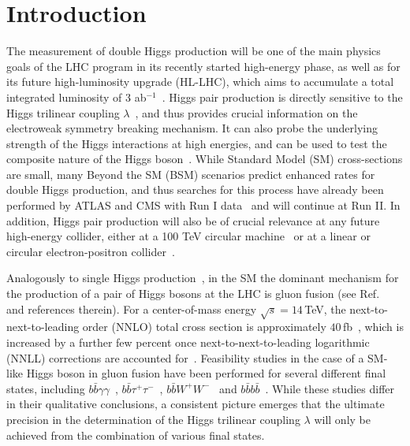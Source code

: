 \section{Introduction}

The measurement of double Higgs production will be one of the main
physics goals of the LHC program in its recently started high-energy
phase, as well as for its future high-luminosity upgrade (HL-LHC),
which aims to accumulate a total integrated
luminosity of 3 ab$^{-1}$~\cite{ATLAS:2013hta,CMS:2013xfa}.
%
Higgs pair production is directly sensitive to the
Higgs trilinear coupling $\lambda$~\cite{baglio}, and thus 
provides crucial
information on the electroweak symmetry breaking mechanism.
%
It can also probe the underlying strength of the Higgs interactions
at high energies, and can be used to test the composite nature of the 
Higgs boson~\cite{Giudice:2007fh,Contino:2010mh}.
%
While Standard Model (SM) cross-sections are small,
many Beyond the SM (BSM)
scenarios predict enhanced rates for double Higgs production, and
thus searches for this process have already been performed by ATLAS and CMS with Run I data~\cite{Aad:2015uka,Aad:2014yja,Khachatryan:2015yea,Chatrchyan:2011wt}
and will continue at Run II.
%
In addition, Higgs pair production will also be of
crucial relevance at
any future high-energy 
collider, either at a 100 TeV circular machine~\cite{Barr:2014sga,Papaefstathiou:2015iba,Azatov:2015oxa} or at
a linear or circular electron-positron collider~\cite{Contino:2013gna}.

Analogously to single Higgs production~\cite{Dittmaier:2012vm}, 
in the SM the dominant mechanism for the production of a pair of
Higgs bosons at the LHC is 
gluon fusion (see Ref.~\cite{baglio,Frederix:2014hta} and
references therein).
%
For a center-of-mass energy $\sqrt{s} = 14\,$TeV, the
next-to-next-to-leading order (NNLO)
total cross section is approximately $40\,$fb~\cite{deFlorian:2013jea},
which is increased by a further few percent once
next-to-next-to-leading logarithmic
(NNLL) corrections
are accounted for~\cite{deFlorian:2015moa}.
%
Feasibility studies in the case of a SM-like Higgs boson
in gluon fusion have been performed for several different final states, including
$b\bar b\gamma\gamma$~\cite{Baur:2003gp,Barger:2013jfa},
$b\bar{b}\tau^+\tau^-$~\cite{Baur:2003gpa,Barr:2013tda,Dolan:2012rv,Dolan:2013rja},
$b\bar{b}W^+W^-$~\cite{Dolan:2012rv,Papaefstathiou:2012qe} and
$b\bar{b}b\bar{b}$~\cite{Baur:2003gpa,Dolan:2012rv,Wardrope:2014kya,deLima:2014dta,Barger:2013jfa}.
%
While these studies differ in their qualitative conclusions,
a consistent picture emerges 
that the ultimate precision in the determination of the Higgs trilinear
coupling $\lambda$
will only be achieved from the combination of various final states.


